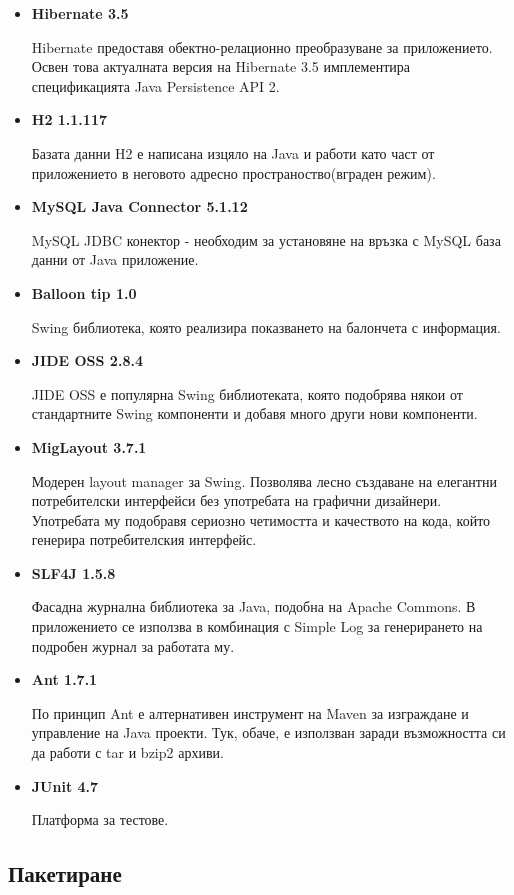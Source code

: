 \begin{itemize}
  \item \textbf{Hibernate 3.5}

    Hibernate предоставя обектно-релационно преобразуване за
    приложението. Освен това актуалната версия на Hibernate 3.5
    имплементира спецификацията Java Persistence API 2.
  \item \textbf{H2 1.1.117}

    Базата данни H2 е написана изцяло на Java и работи като част от
    приложението в неговото адресно пространоство(вграден режим).
  \item \textbf{MySQL Java Connector 5.1.12}

    MySQL JDBC конектор - необходим за установяне на връзка с MySQL
    база данни от Java приложение.
  \item \textbf{Balloon tip 1.0}

    Swing библиотека, която реализира показването на балончета с
    информация. 
  \item \textbf{JIDE OSS 2.8.4}

    JIDE OSS е популярна Swing библиотеката, която подобрява някои от
    стандартните Swing компоненти и добавя много други нови компоненти.
  \item \textbf{MigLayout 3.7.1}

    Модерен layout manager за Swing. Позволява лесно създаване на
    елегантни потребителски интерфейси без употребата на графични
    дизайнери. Употребата му подобравя сериозно четимостта и
    качеството на кода, който генерира потребителския интерфейс.
  \item \textbf{SLF4J 1.5.8}

    Фасадна журнална библиотека за Java, подобна на Apache Commons. В
    приложението се използва в комбинация с Simple Log за генерирането
    на подробен журнал за работата му.
  \item \textbf{Ant 1.7.1}

    По принцип Ant е алтернативен инструмент на Maven за изграждане и
    управление на Java проекти. Тук, обаче, е използван заради
    възможността си да работи с tar и bzip2 архиви.
  \item \textbf{JUnit 4.7}

    Платформа за тестове.
\end{itemize}
\subsection{Пакетиране}

